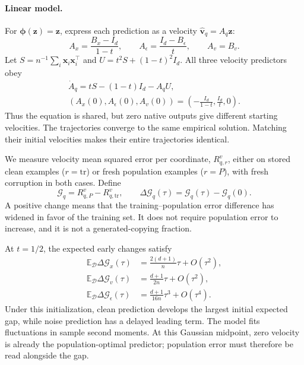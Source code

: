 \paragraph{Linear model.}
For $\boldsymbol\phi(\mathbf z)=\mathbf z$, express each prediction as a velocity
$\widehat{\mathbf v}_q=A_q\mathbf z$:
\begin{equation}
 A_x=\frac{B_x-I_d}{1-t},\qquad
 A_\epsilon=\frac{I_d-B_\epsilon}{t},\qquad A_v=B_v.
 \label{eq:main_velocity_conversion}
\end{equation}
Let $S=n^{-1}\sum_i\mathbf x_i\mathbf x_i^\top$ and
$U=t^2S+(1-t)^2I_d$.
All three velocity predictors obey
\begin{equation}
 \begin{gathered}
 \dot A_q=tS-(1-t)I_d-A_qU,
 \\
 (A_x(0),A_\epsilon(0),A_v(0))
 =\left(-\frac{I_d}{1-t},\frac{I_d}{t},0\right).
 \end{gathered}
 \label{eq:main_shared_flow}
\end{equation}
Thus the equation is shared, but zero native outputs give different starting
velocities. The trajectories converge to the same empirical solution.
Matching their initial velocities makes their entire trajectories identical.

We measure velocity mean squared error per coordinate, $R^v_{q,r}$,
either on stored clean examples ($r=\mathrm{tr}$) or fresh population
examples ($r=P$), with fresh corruption in both cases. Define
\begin{equation}
 \mathcal G_q=R^v_{q,P}-R^v_{q,\mathrm{tr}},\qquad
 \Delta\mathcal G_q(\tau)=\mathcal G_q(\tau)-\mathcal G_q(0).
 \label{eq:main_gap}
\end{equation}
A positive change means that the training--population error difference has
widened in favor of the training set. It does not require population error
to increase, and it is not a generated-copying fraction.

At $t=1/2$, the expected early changes satisfy
\begin{equation}
\begin{aligned}
 \mathbb E_{\mathcal D}\Delta\mathcal G_x(\tau)
 &=\frac{2(d+1)}{n}\tau+O(\tau^2),\\
 \mathbb E_{\mathcal D}\Delta\mathcal G_v(\tau)
 &=\frac{d+1}{2n}\tau+O(\tau^2),\\
 \mathbb E_{\mathcal D}\Delta\mathcal G_\epsilon(\tau)
 &=\frac{d+1}{16n}\tau^3+O(\tau^4).
\end{aligned}
\label{eq:main_early_gap}
\end{equation}
Under this initialization, clean prediction develops the largest initial
expected gap, while noise prediction has a delayed leading term.
The model fits fluctuations in sample second moments. At this Gaussian
midpoint, zero velocity is already the population-optimal predictor;
population error must therefore be read alongside the gap.

